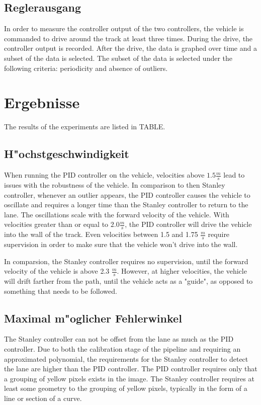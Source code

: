 \documentclass[arbeit=studie,oneside,BCOR=12mm]{ArbeitRST}
\begin{document}
\subsection{Reglerausgang}

In order to measure the controller output of the two controllers, the vehicle
is commanded to drive around the track at least three times. During the drive,
the controller output is recorded. After the drive, the data is graphed over
time and a subset of the data is selected. The subset of the data is selected
under the following criteria: periodicity and absence of outliers.

\section{Ergebnisse}

The results of the experiments are listed in TABLE. 

\subsection{H"ochstgeschwindigkeit}

When running the PID controller on the vehicle, velocities above $1.5 \frac{m}{s}$
lead to issues with the robustness of the vehicle. In comparison to then Stanley 
controller, whenever an outlier appears, the PID controller causes the vehicle to oscillate and
requires a longer time than the Stanley controller to return to the lane. The oscillations 
scale with the forward velocity of the vehicle. With velocities greater than or equal to 
$2.0 \frac{m}{s}$, the PID controller will drive the vehicle into the wall of the track. Even 
velocities between 1.5 and 1.75 $\frac{m}{s}$ require supervision in order to make sure that the 
vehicle won't drive into the wall.

In comparsion, the Stanley controller requires no supervision, until the
forward velocity of the vehicle is above 2.3 $\frac{m}{s}$. However, at higher
velocities, the vehicle will drift farther from the path, until the vehicle
acts as a "guide", as opposed to something that needs to be followed. 

\subsection{Maximal m"oglicher Fehlerwinkel}

The Stanley controller can not be offset from the lane as much as the PID controller.
Due to both the calibration stage of the pipeline and requiring an approximated polynomial,
the requirements for the Stanley controller to detect the lane are higher than the PID 
controller. The PID controller requires only that a grouping of yellow pixels exists in the
image. The Stanley controller requires at least some geometry to the grouping of yellow pixels, typically
in the form of a line or section of a curve.
\end{document}
